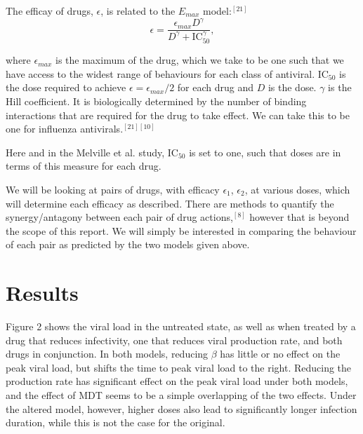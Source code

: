 \documentclass[a4paper,11pt]{article}
\begin{document}
The efficay of drugs, $\epsilon$, is related to the $E_{max}$ model:$^{[21]}$ $$\epsilon = \frac{\epsilon_{max}D^\gamma}{D^\gamma+\mathrm{IC}_{50}^\gamma},$$

where $\epsilon_{max}$ is the maximum of the drug, which we take to be one such that we have access to the widest range of behaviours for each class of antiviral. $\mathrm{IC}_{50}$ is the dose required to achieve $\epsilon = \epsilon_{max}/2$ for each drug and $D$ is the dose. $\gamma$ is the Hill coefficient. It is biologically determined by the number of binding interactions that are required for the drug to take effect. We can take this to be one for influenza antivirals.$^{[21][10]}$

Here and in the Melville et al. study, $\mathrm{IC}_{50}$ is set to one, such that doses are in terms of this measure for each drug.


We will be looking at pairs of drugs, with efficacy $\epsilon_1$, $\epsilon_2$, at various doses, which will determine each efficacy as described. There are methods to quantify the synergy/antagony between each pair of drug actions,$^{[8]}$ however that is beyond the scope of this report. We will simply be interested in comparing the behaviour of each pair as predicted by the two models given above.

\section*{Results}
Figure 2 shows the viral load in the untreated state, as well as when treated by a drug that reduces infectivity, one that reduces viral production rate, and both drugs in conjunction. In both models, reducing $\beta$ has little or no effect on the peak viral load, but shifts the time to peak viral load to the right. Reducing the production rate has significant effect on the peak viral load under both models, and the effect of MDT seems to be a simple overlapping of the two effects. Under the altered model, however, higher doses also lead to significantly longer infection duration, while this is not the case for the original.
\end{document}
